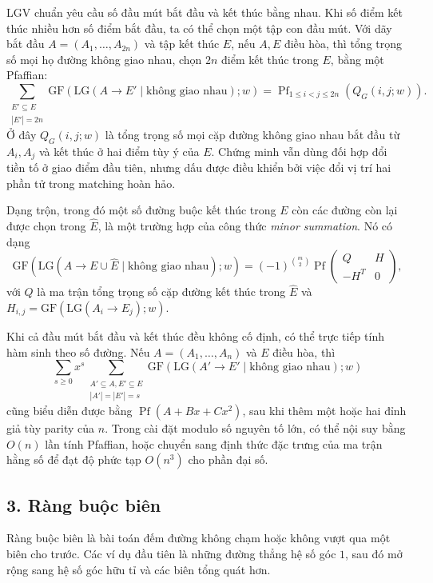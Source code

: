 \documentclass[11pt]{article}
\begin{document}
LGV chuẩn yêu cầu số đầu mút bắt đầu và kết thúc bằng nhau. Khi số điểm kết
thúc nhiều hơn số điểm bắt đầu, ta có thể chọn một tập con đầu mút. Với dãy
bắt đầu \(A=(A_1,\ldots,A_{2n})\) và tập kết thúc \(E\), nếu \(A,E\) điều hòa,
thì tổng trọng số mọi họ đường không giao nhau, chọn \(2n\) điểm kết thúc
trong \(E\), bằng một Pfaffian:
\[
  \sum_{\substack{E'\subseteq E\\ |E'|=2n}}
  \mathrm{GF}(\mathrm{LG}(A\to E'\mid\text{không giao nhau});w)
  =
  \operatorname{Pf}_{1\le i<j\le 2n}(Q_G(i,j;w)).
\]
Ở đây \(Q_G(i,j;w)\) là tổng trọng số mọi cặp đường không giao nhau bắt đầu từ
\(A_i,A_j\) và kết thúc ở hai điểm tùy ý của \(E\). Chứng minh vẫn dùng đối
hợp đổi tiền tố ở giao điểm đầu tiên, nhưng dấu được điều khiển bởi việc đổi
vị trí hai phần tử trong matching hoàn hảo.

Dạng trộn, trong đó một số đường buộc kết thúc trong \(E\) còn các đường còn
lại được chọn trong \(\widehat E\), là một trường hợp của công thức
\emph{minor summation}. Nó có dạng
\[
  \mathrm{GF}(\mathrm{LG}(A\to E\cup\widehat E\mid\text{không giao nhau});w)
  =
  (-1)^{\binom m2}
  \operatorname{Pf}
  \begin{pmatrix}
    Q & H\\
    -H^T & 0
  \end{pmatrix},
\]
với \(Q\) là ma trận tổng trọng số cặp đường kết thúc trong \(\widehat E\) và
\(H_{i,j}=\mathrm{GF}(\mathrm{LG}(A_i\to E_j);w)\).

Khi cả đầu mút bắt đầu và kết thúc đều không cố định, có thể trực tiếp tính
hàm sinh theo số đường. Nếu \(A=(A_1,\ldots,A_n)\) và \(E\) điều hòa, thì
\[
  \sum_{s\ge0} x^s
  \sum_{\substack{A'\subseteq A,E'\subseteq E\\ |A'|=|E'|=s}}
  \mathrm{GF}(\mathrm{LG}(A'\to E'\mid\text{không giao nhau});w)
\]
cũng biểu diễn được bằng \(\operatorname{Pf}(A+Bx+Cx^2)\), sau khi thêm một
hoặc hai đỉnh giả tùy parity của \(n\). Trong cài đặt modulo số nguyên tố lớn,
có thể nội suy bằng \(O(n)\) lần tính Pfaffian, hoặc chuyển sang định thức đặc
trưng của ma trận hằng số để đạt độ phức tạp \(O(n^3)\) cho phần đại số.

\subsection*{3. Ràng buộc biên}

Ràng buộc biên là bài toán đếm đường không chạm hoặc không vượt qua một biên
cho trước. Các ví dụ đầu tiên là những đường thẳng hệ số góc \(1\), sau đó mở
rộng sang hệ số góc hữu tỉ và các biên tổng quát hơn.
\end{document}
